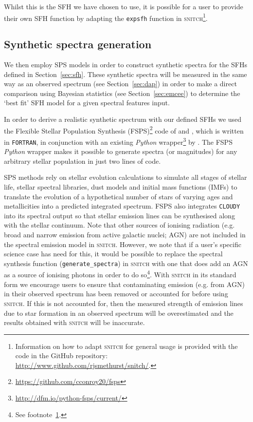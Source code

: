 \documentclass[useAMS,usenatbib]{mn2e}
\def\referee		{\color{refer}}
\begin{document}
Whilst this is the SFH we have chosen to use, it is possible for a user to provide their own SFH function by adapting the \texttt{expsfh} function in \textsc{snitch}\footnote{\label{adapt}Information on how to adapt \textsc{snitch} for general usage is provided with the code in the GitHub repository: \url{http://www.github.com/rjsmethurst/snitch/}.}.


\subsection{Synthetic spectra generation}\label{sec:fsps}

We then employ SPS models in order to construct synthetic spectra for the SFHs defined in Section~\ref{sec:sfh}. These synthetic spectra will be measured in the same way as an observed spectrum (see Section~\ref{sec:dap}) in order to make a direct comparison using Bayesian statistics (see Section~\ref{sec:emcee}) to determine the `best fit' SFH model for a given spectral features input. 

In order to derive a realistic synthetic spectrum with our defined SFHs we used the Flexible Stellar Population Synthesis (FSPS)\footnote{\url{https://github.com/cconroy20/fsps}} code of \cite{conroy09} and \citet{conroy10}, which is written in \texttt{FORTRAN}, in conjunction with an existing \emph{Python} wrapper\footnote{\url{http://dfm.io/python-fsps/current/}} by \cite{python_fsps}. The FSPS \emph{Python} wrapper makes it possible to generate spectra (or magnitudes) for any arbitrary stellar population in just two lines of code.  

SPS methods rely on stellar evolution calculations to simulate all stages of stellar life, stellar spectral libraries, dust models and initial mass functions (IMFs) to translate the evolution of a hypothetical number of stars of varying ages and metallicities into a predicted integrated spectrum. FSPS also integrates \texttt{CLOUDY} \citep{ferland13} into its spectral output so that stellar emission lines can be synthesised along with the stellar continuum. {\referee Note that other sources of ionising radiation (e.g. broad and narrow emission from active galactic nuclei; AGN) are not included in the spectral emission model in \textsc{snitch}. However, we note that if a user's specific science case has need for this, it would be possible to replace the spectral synthesis function (\texttt{generate\_spectra}) in \textsc{snitch} with one that does add an AGN as a source of ionising photons in order to do so\footnote{See footnote~\ref{adapt}.}. With \textsc{snitch} in its standard form we encourage users to ensure that contaminating emission (e.g. from AGN) in their observed spectrum has been removed or accounted for before using \textsc{snitch}. If this is not accounted for, then the measured strength of emission lines due to star formation in an observed spectrum will be overestimated and the results obtained with \textsc{snitch} will be inaccurate.}
\end{document}
